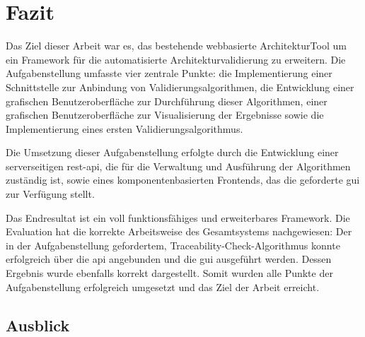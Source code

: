 
\chapter{Fazit}
\label{ch:fazit}



Das Ziel dieser Arbeit war es, das bestehende webbasierte ArchitekturTool um ein Framework für die automatisierte Architekturvalidierung zu erweitern. Die Aufgabenstellung umfasste vier zentrale Punkte: die Implementierung einer Schnittstelle zur Anbindung von Validierungsalgorithmen, die Entwicklung einer grafischen Benutzeroberfläche zur Durchführung dieser Algorithmen, einer grafischen Benutzeroberfläche zur Visualisierung der Ergebnisse sowie die Implementierung eines ersten Validierungsalgorithmus.

Die Umsetzung dieser Aufgabenstellung erfolgte durch die Entwicklung einer serverseitigen \gls{rest}-\gls{api}, die für die Verwaltung und  Ausführung der Algorithmen zuständig ist, sowie eines komponentenbasierten Frontends, das die geforderte \gls{gui} zur Verfügung stellt.

Das Endresultat ist ein voll funktionsfähiges und erweiterbares Framework. Die Evaluation hat die korrekte Arbeitsweise des Gesamtsystems nachgewiesen: Der in der Aufgabenstellung gefordertem, Traceability-Check-Algorithmus konnte erfolgreich über die \gls{api} angebunden und die \gls{gui} ausgeführt werden. Dessen Ergebnis wurde ebenfalls korrekt dargestellt. Somit wurden alle Punkte der Aufgabenstellung erfolgreich umgesetzt und das Ziel der Arbeit erreicht.

\section{Ausblick} %


